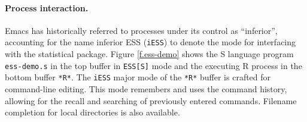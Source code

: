 \documentclass{article}
\newcommand{\stexttt}[1]{{\small\texttt{#1}}}
\begin{document}
\paragraph{Process interaction.}
Emacs has historically referred to processes under its control as
``inferior'', accounting for the name inferior ESS (\stexttt{iESS}) to
denote the mode for interfacing with the statistical package.  Figure
\ref{f.ess-demo} shows the S language program \stexttt{ess-demo.s} in
the top buffer in \stexttt{ESS[S]} mode and the executing R process in
the bottom buffer \stexttt{*R*}.  The
\stexttt{iESS} major mode of the \stexttt{*R*} buffer is crafted for
command-line editing.  This mode remembers and uses the command
history, allowing for the recall and searching of previously entered
commands.  Filename completion for local directories is also
available.
\end{document}
